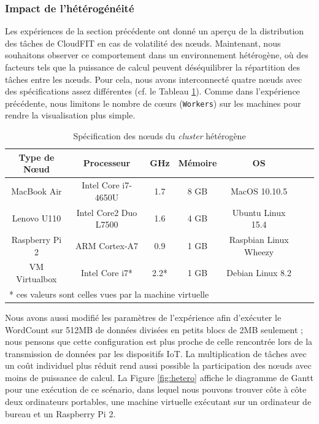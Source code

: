 \subsubsection*{Impact de l'hétérogénéité\label{subsubsec:cloudfit-heterogene}}

Les expériences de la section précédente ont donné un aperçu de la distribution des tâches de CloudFIT en cas de volatilité des n{\oe}uds. Maintenant, nous souhaitons observer ce comportement dans un environnement hétérogène, où des facteurs tels que la puissance de calcul peuvent déséquilibrer la répartition des tâches entre les n{\oe}uds. Pour cela, nous avons interconnecté quatre n{\oe}uds avec des spécifications assez différentes (cf. le Tableau \ref{Table:laptops}). Comme dans l'expérience précédente, nous limitons le nombre de c{\oe}urs (\texttt{Workers}) sur les machines pour rendre la visualisation plus simple.

\begin{table}
	\begin{center}
		\begin{tabular}{|c|c|c|c|c|c|c|}
			\hline
			Type de N{\oe}ud & Processeur & GHz &  Mémoire & OS\\
			\hline
			\hline
			MacBook Air & Intel Core i7-4650U & 1.7   & 8 GB & MacOS 10.10.5 \\
			Lenovo U110 & Intel Core2 Duo L7500 & 1.6   & 4 GB & Ubuntu Linux 15.4 \\
			Raspberry Pi 2 & ARM Cortex-A7 & 0.9  & 1 GB & Raspbian Linux Wheezy\\
			VM Virtualbox & Intel Core i7* & 2.2*  &  1 GB & Debian Linux 8.2 \\
			\hline
			\multicolumn{5}{l}{* ces valeurs sont celles vues par la machine virtuelle}
		\end{tabular}
	\end{center}
	\caption{\label{Table:laptops}Spécification des n{\oe}uds du \textit{cluster} hétérogène}
\end{table} 

Nous avons aussi modifié les paramètres de l'expérience afin d'exécuter le WordCount sur 512MB de données divisées en petits blocs de 2MB seulement ; nous pensons que cette configuration est plus proche de celle rencontrée lors de la transmission de données par les dispositifs IoT. La multiplication de tâches avec un coût individuel plus réduit rend aussi possible la participation des n{\oe}uds avec moins de puissance de calcul.  La Figure \ref{fig:hetero} affiche le diagramme de Gantt pour une exécution de ce scénario, dans lequel nous pouvons trouver côte à côte deux ordinateurs portables, une machine virtuelle exécutant sur un ordinateur de bureau et un Raspberry Pi 2. 

